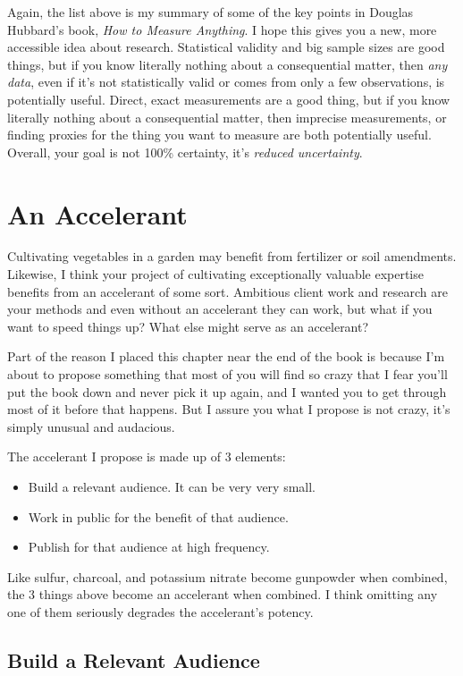 Again, the list above is my summary of some of the key points in Douglas Hubbard's book, \emph{How to Measure Anything}. I hope this gives you a new, more accessible idea about research. Statistical validity and big sample sizes are good things, but if you know literally nothing about a consequential matter, then \emph{any data}, even if it's not statistically valid or comes from only a few observations, is potentially useful. Direct, exact measurements are a good thing, but if you know literally nothing about a consequential matter, then imprecise measurements, or finding proxies for the thing you want to measure are both potentially useful. Overall, your goal is not 100\% certainty, it's \emph{reduced uncertainty}.

\section{An Accelerant}

Cultivating vegetables in a garden may benefit from fertilizer or soil amendments. Likewise, I think your project of cultivating exceptionally valuable expertise benefits from an accelerant of some sort. Ambitious client work and research are your methods and even without an accelerant they can work, but what if you want to speed things up? What else might serve as an accelerant?

Part of the reason I placed this chapter near the end of the book is because I'm about to propose something that most of you will find so crazy that I fear you'll put the book down and never pick it up again, and I wanted you to get through most of it before that happens. But I assure you what I propose is not crazy, it's simply unusual and audacious.

The accelerant I propose is made up of 3 elements:

\begin{itemize}
\item Build a relevant audience. It can be very very small.
\item Work in public for the benefit of that audience.
\item Publish for that audience at high frequency.
\end{itemize}

Like sulfur, charcoal, and potassium nitrate become gunpowder when combined, the 3 things above become an accelerant when combined. I think omitting any one of them seriously degrades the accelerant's potency.

\subsection{Build a Relevant Audience}


